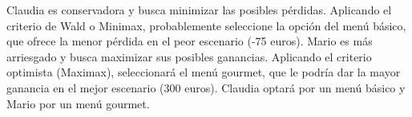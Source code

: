\documentclass[
]{article}
\begin{document}
Claudia es conservadora y busca minimizar las posibles pérdidas.
Aplicando el criterio de Wald o Minimax, probablemente seleccione la
opción del menú básico, que ofrece la menor pérdida en el peor escenario
(-75 euros). Mario es más arriesgado y busca maximizar sus posibles
ganancias. Aplicando el criterio optimista (Maximax), seleccionará el
menú gourmet, que le podría dar la mayor ganancia en el mejor escenario
(300 euros). Claudia optará por un menú básico y Mario por un menú
gourmet.
\end{document}

